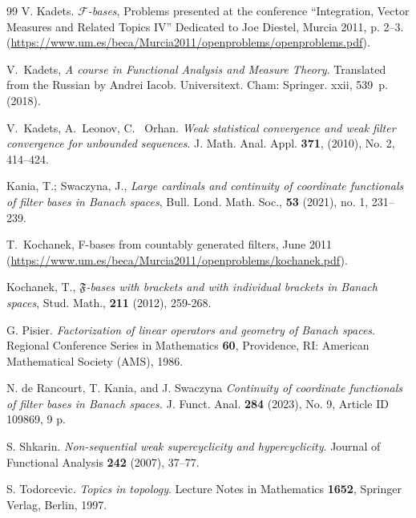 \documentclass[11pt,twoside, reqno]{amsart}
\newcommand{\F}{\mathfrak{F}}
\theoremstyle{plain}
\theoremstyle{remark}
\theoremstyle{definition}
\numberwithin{equation}{section}
\begin{document}
\begin{thebibliography}{99}
 V. Kadets. \textit{$\mathcal F$-bases}, Problems presented at the conference ``Integration, Vector Measures and Related Topics IV'' Dedicated to Joe Diestel, Murcia 2011, p. 2--3. (\url{https://www.um.es/beca/Murcia2011/openproblems/openproblems.pdf}).

 V.~Kadets, \textit{A course in Functional Analysis and Measure Theory}. Translated from the Russian by Andrei Iacob. Universitext. Cham: Springer. xxii, 539~p. (2018).

  V.~Kadets, A.~Leonov, C.~ Orhan. \textit{Weak statistical convergence and weak filter convergence for unbounded sequences}. J. Math. Anal. Appl. \textbf{371}, (2010), No. 2, 414--424. 


 Kania, T.; Swaczyna, J., \textit{Large cardinals and continuity of coordinate functionals of filter bases in Banach spaces}, Bull. Lond. Math. Soc., \textbf{53} (2021), no. 1, 231--239.

 T.~Kochanek, F-bases from countably generated filters, June 2011 (\url{https://www.um.es/beca/Murcia2011/openproblems/kochanek.pdf}).

 Kochanek, T., \textit{$\F$-bases with brackets and with individual brackets in Banach spaces}, Stud. Math., \textbf{211} (2012), 259-268.

 G. Pisier. \textit{Factorization of linear operators and geometry of Banach spaces}. Regional Conference Series in Mathematics {\bf 60}, Providence, RI: American Mathematical Society (AMS), 1986.

 N. de Rancourt, T.  Kania, and J.  Swaczyna
\textit{Continuity of coordinate functionals of filter bases in Banach spaces.} J. Funct. Anal. \textbf{284} (2023), No. 9, Article ID 109869, 9 p. 

 S. Shkarin.  \textit{Non-sequential weak supercyclicity and hypercyclicity}. Journal of Functional Analysis \textbf{242} (2007), 37--77.

  S. Todorcevic. \textit{Topics in topology}. Lecture Notes in
Mathematics {\bf 1652}, Springer Verlag, Berlin, 1997.

\end{thebibliography}
\end{document}
